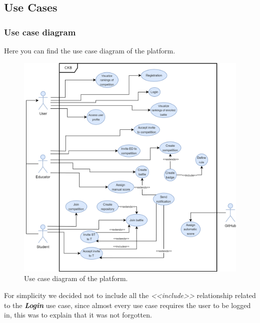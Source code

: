 \pagebreak

\subsection{Use Cases}
\label{ss:Use_cases}%

\subsubsection*{Use case diagram}
Here you can find the use case diagram of the platform. 
\begin{center}
  \begin{figure} [H]
    \begin{center}
        \includegraphics[width=\textwidth,height=\textheight,keepaspectratio]{Images/RASD_UseCaseDiagram.png}
        \caption{Use case diagram of the platform.}
        \label{fig: UseCaseDiagram}
    \end{center}
  \end{figure}
\end{center}

For simplicity we decided not to include all the \textit{<<include>>} relationship related to the \textbf{\textit{Login}} use case, since  almost every use case requires the user to be logged in, this was to explain that it was not forgotten.

